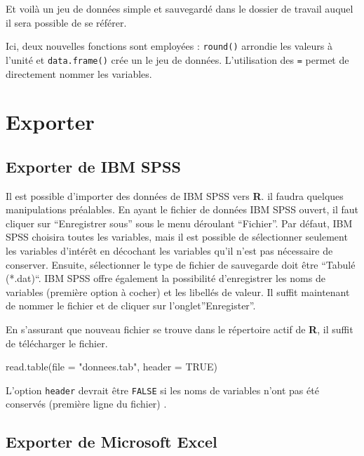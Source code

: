 \documentclass[
]{book}
\newenvironment{Shaded}{}{}
\newcommand{\AttributeTok}[1]{#1}
\newcommand{\ConstantTok}[1]{#1}
\newcommand{\FunctionTok}[1]{#1}
\newcommand{\NormalTok}[1]{#1}
\newcommand{\StringTok}[1]{#1}
\begin{document}
Et voilà un jeu de données simple et sauvegardé dans le dossier de travail auquel il sera possible de se référer.

Ici, deux nouvelles fonctions sont employées : \texttt{round()} arrondie les valeurs à l'unité et \texttt{data.frame()} crée un le jeu de données. L'utilisation des \texttt{=} permet de directement nommer les variables.

\hypertarget{exporter}{%
\section{Exporter}\label{exporter}}

\hypertarget{exporter-de-ibm-spss}{%
\subsection{Exporter de IBM SPSS}\label{exporter-de-ibm-spss}}

Il est possible d'importer des données de IBM SPSS vers \textbf{R}. il faudra quelques manipulations préalables. En ayant le fichier de données IBM SPSS ouvert, il faut cliquer sur ``Enregistrer sous'' sous le menu déroulant ``Fichier''. Par défaut, IBM SPSS choisira toutes les variables, mais il est possible de sélectionner seulement les variables d'intérêt en décochant les variables qu'il n'est pas nécessaire de conserver. Ensuite, sélectionner le type de fichier de sauvegarde doit être ``Tabulé (*.dat)``. IBM SPSS offre également la possibilité d'enregistrer les noms de variables (première option à cocher) et les libellés de valeur. Il suffit maintenant de nommer le fichier et de cliquer sur l'onglet''Enregister''.

En s'assurant que nouveau fichier se trouve dans le répertoire actif de \textbf{R}, il suffit de télécharger le fichier.

\begin{Shaded}
\begin{Highlighting}[]
\FunctionTok{read.table}\NormalTok{(}\AttributeTok{file =} \StringTok{"donnees.tab"}\NormalTok{, }\AttributeTok{header =} \ConstantTok{TRUE}\NormalTok{)}
\end{Highlighting}
\end{Shaded}

L'option \texttt{header} devrait être \texttt{FALSE} si les noms de variables n'ont pas été conservés (première ligne du fichier) .

\hypertarget{exporter-de-microsoft-excel}{%
\subsection{Exporter de Microsoft Excel}\label{exporter-de-microsoft-excel}}
\end{document}
